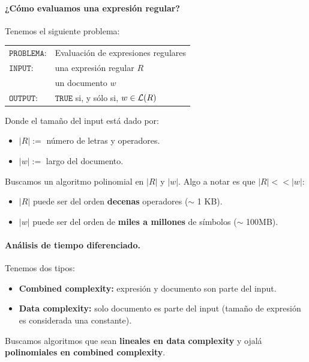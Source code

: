 \paragraph{¿Cómo evaluamos una expresión regular?} Tenemos el siguiente problema:
\begin{table}[H]
    \centering
    \begin{tabular}{ll}
        $\texttt{PROBLEMA:}$ & Evaluación de expresiones regulares              \\
        $\texttt{INPUT:}$    & una expresión regular $R$                        \\
                             & un documento $w$                                 \\
        $\texttt{OUTPUT:}$   & $\texttt{TRUE}$ si, y sólo si, $w \in \mathcal{L}(R)$
    \end{tabular}
\end{table}

Donde el tamaño del input está dado por:
\begin{itemize}
    \item $|R|:=$ número de letras y operadores.
    \item $|w|:=$ largo del documento.
\end{itemize}

Buscamos un algoritmo polinomial en $\lvert R \rvert$ y $\lvert w\rvert$. Algo a notar es que $\lvert R\rvert <{}<\lvert w \rvert$:
\begin{itemize}
    \item $|R|$ puede ser del orden \textbf{decenas} operadores ($\sim$ 1 KB).
    \item $|w|$ puede ser del orden de \textbf{miles a millones} de símbolos ($\sim$ 100MB).
\end{itemize}

\paragraph{Análisis de tiempo diferenciado.} Tenemos dos tipos:
\begin{itemize}
    \item \textbf{Combined complexity:} expresión y documento son parte del input.
    \item \textbf{Data complexity:} solo documento es parte del input (tamaño de expresión es considerada una constante).
\end{itemize}

Buscamos algoritmos que sean \textbf{lineales en data complexity} y ojalá \textbf{polinomiales en combined complexity}. \medbreak

